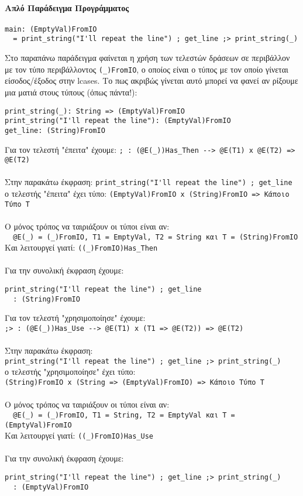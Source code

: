 \documentclass[diploma]{softlab-thesis}
\begin{document}
\paragraph{Απλό Παράδειγμα Προγράμματος}
\begin{verbatim}
main: (EmptyVal)FromIO
  = print_string("I'll repeat the line") ; get_line ;> print_string(_)
\end{verbatim}
Στο παραπάνω παράδειγμα φαίνεται η χρήση των τελεστών δράσεων σε περιβάλλον με
τον τύπο περιβάλλοντος \verb|(_)FromIO|, ο οποίος είναι ο τύπος με τον οποίο
γίνεται είσοδος/έξοδος στην lcases. Το πως ακριβώς γίνεται αυτό μπορεί να φανεί
αν ρίξουμε μια ματιά στους τύπους (όπως πάντα!):
\begin{verbatim}
print_string(_): String => (EmptyVal)FromIO
print_string("I'll repeat the line"): (EmptyVal)FromIO
get_line: (String)FromIO

\end{verbatim}
Για τον τελεστή "έπειτα" έχουμε:
\verb|; : (@E(_))Has_Then --> @E(T1) x @E(T2) => @E(T2)|
\\\\
Στην παρακάτω έκφραση:
\verb|print_string("I'll repeat the line") ; get_line|
\\
ο τελεστής "έπειτα" έχει τύπο:
\verb|(EmptyVal)FromIO x (String)FromIO => Κάποιο Τύπο Τ|
\\\\
Ο μόνος τρόπος να ταιριάξουν οι τύποι είναι αν:
\\
\verb|  @E(_) = (_)FromIO, T1 = EmptyVal, T2 = String και T = (String)FromIO|
\\
Και λειτουργεί γιατί: \verb|((_)FromIO)Has_Then|
\\\\
Για την συνολική έκφραση έχουμε:
\begin{verbatim}
print_string("I'll repeat the line") ; get_line
  : (String)FromIO

\end{verbatim}
Για τον τελεστή "χρησιμοποίησε" έχουμε:
\\
\verb|;> : (@E(_))Has_Use --> @E(T1) x (T1 => @E(T2)) => @E(T2)|
\\\\
Στην παρακάτω έκφραση:
\\
\verb|print_string("I'll repeat the line") ; get_line ;> print_string(_)|
\\
ο τελεστής "χρησιμοποίησε" έχει τύπο:
\\
\verb|(String)FromIO x (String => (EmptyVal)FromIO) => Κάποιο Τύπο Τ|
\\\\
Ο μόνος τρόπος να ταιριάξουν οι τύποι είναι αν:
\\
\verb|  @E(_) = (_)FromIO, T1 = String, T2 = EmptyVal και Τ = (EmptyVal)FromIO|
\\
Και λειτουργεί γιατί: \verb|((_)FromIO)Has_Use|
\\\\
Για την συνολική έκφραση έχουμε:
\begin{verbatim}
print_string("I'll repeat the line") ; get_line ;> print_string(_)
  : (EmptyVal)FromIO
\end{verbatim}
\end{document}
